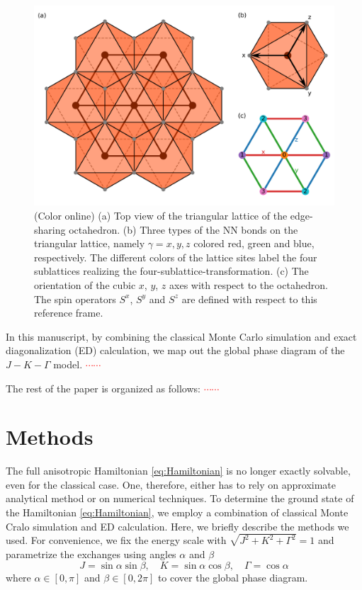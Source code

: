 \documentclass[aps,prb,reprint,amsfonts,amsmath,amssymb,showpacs,groupedaddress,superscriptaddress]{revtex4-1}
\begin{document}
\begin{figure}
    \includegraphics[width=\columnwidth]{Fig1.pdf}
    \caption{(Color online) (a) Top view of the triangular lattice of the edge-sharing octahedron. (b) Three types of the NN bonds on the triangular lattice, namely $\gamma=x, y, z$ colored red, green and blue, respectively. The different colors of the lattice sites label the four sublattices realizing the four-sublattice-transformation. (c) The orientation of the cubic $x$, $y$, $z$ axes with respect to the octahedron. The spin operators $S^x$, $S^y$ and $S^z$ are defined with respect to this reference frame.}
    \label{fig:ModelDefinition}
\end{figure}

In this manuscript, by combining the classical Monte Carlo simulation and exact diagonalization (ED) calculation, we map out the global phase diagram of the $J-K-\Gamma$ model. \textcolor{red}{$\cdots\cdots$}

The rest of the paper is organized as follows: \textcolor{red}{$\cdots\cdots$}

\section{Methods}
The full anisotropic Hamiltonian \eqref{eq:Hamiltonian} is no longer exactly solvable, even for the classical case. One, therefore, either has to rely on approximate analytical method or on numerical techniques. To determine the ground state of the Hamiltonian \eqref{eq:Hamiltonian}, we employ a combination of classical Monte Cralo simulation and ED calculation. Here, we briefly describe the methods we used. For convenience, we fix the energy scale with $\sqrt{J^2 + K^2 + \Gamma^2}=1$ and parametrize the exchanges using angles $\alpha$ and $\beta$
\begin{equation}
    J=\sin\alpha \sin\beta, \quad K=\sin\alpha \cos\beta, \quad \Gamma=\cos\alpha
    \label{eq:Parameters}
\end{equation}
where $\alpha \in [0, \pi]$ and $\beta \in [0, 2\pi]$ to cover the global phase diagram.
\end{document}
